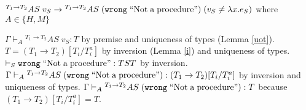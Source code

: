 \begin{case}
$^{T_{1}\rightarrow T_{2}}AS\;v_{S}\rightarrow{^{T_{1}\rightarrow T_{2}}A}S\;(\mathtt{wrong}\;\mathrm{``Not\;a\;procedure"})\;(v_{S}\neq\lambda x.e_{S})$ where $A\in\lbrace H,M\rbrace$

$\Gamma\vdash_{A}{^{T_{1}\rightarrow T_{2}}A}S\;v_{S}:T$ by premise and uniqueness of types (Lemma \ref{uot}).  $T=(T_{1}\rightarrow T_{2})[T_{i}/T_{i}^{a}]$ by inversion (Lemma \ref{i}) and uniqueness of types.  $\vdash_{S}\mathtt{wrong}\;\mathrm{``Not\;a\;procedure"}:TST$ by inversion.  $\Gamma\vdash_{A}{^{T_{1}\rightarrow T_{2}}A}S\;(\mathtt{wrong}\;\mathrm{``Not\;a\;procedure"}):(T_{1}\rightarrow T_{2})[T_{i}/T_{i}^{a}]$ by inversion and uniqueness of types.  $\Gamma\vdash_{A}{^{T_{1}\rightarrow T_{2}}A}S\;(\mathtt{wrong}\;\mathrm{``Not\;a\;procedure"}):T$ because $(T_{1}\rightarrow T_{2})[T_{i}/T_{i}^{a}]=T$.
\end{case}